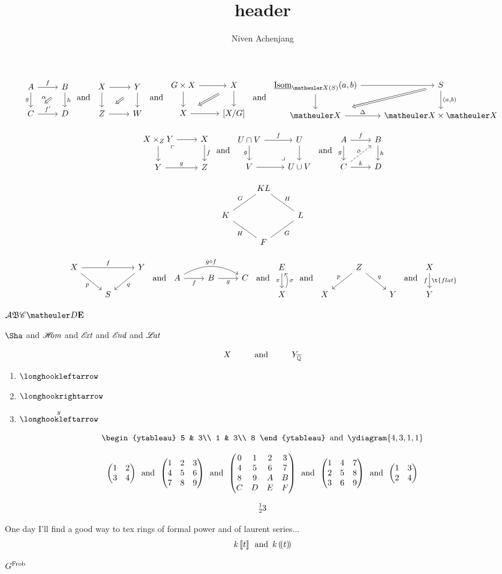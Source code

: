 \documentclass{article}
\title{header}
\author{Niven Achenjang}
\numberwithin{thm}{section}
\numberwithin{prob}{section}
\numberwithin{equation}{section}
\begin{document}
$$\twocommsquare AfBghC{f'}D\alpha\tand\baretwocommsquare XYZW\tand\baretwocommsquare{G\by X}XX{[X/G]}\tand\twocommsquare{\ul\Isom_{\meX(S)}(a,b)}{}S{}{(a,b)}\meX\Delta{\meX\by\meX}{}$$

$$\pullback {X\by_ZY}XfYgZ\tand\pushout {U\cap V}fUgV{U\cup V}\tand\liftsquare AfBghCkD\alpha$$

$$\galoisdiamond{KL}GHKLHGF$$

$$\mapover XfYpqS\tand\compdiag AfBgC{g\circ f}\tand\mapwithsect E\pi X\sigma\tand\correspondence ZpqXY\tand\mapdown Xf{\t{flat}}Y$$

$\mcA\mf B\msC\meD\mbf E$

$\Sha$ and $\sHom$ and $\sExt$ and $\sEnd$ and $\sLat$

$$X\Text{and}\sspacing Y_\Qbar$$

\begin{enumerate}
    \item  $\fintoo$
    \item  $\intoo$
    \item $\xfintoo{y}$
\end{enumerate}
$$\begin{ytableau}
    5 & 3\\
    1 & 3\\
    8
\end{ytableau}\tand\ydiagram{4,3,1,1}$$

$$\mat1234\tand\Mat123456789\tand\MAT0123456789ABCDEF\tand\Matt123456789\tand\matt1234$$

$$\prescript123$$

One day I'll find a good way to tex rings of formal power and of laurent series...
$$k\dsq t\tand k\dparens t$$

$G^\Frob$
\end{document}
